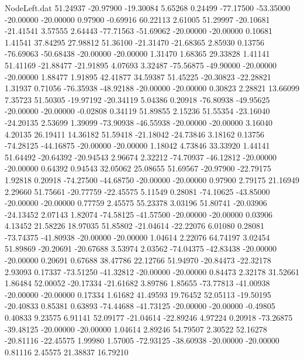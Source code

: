 \begin{filecontents}{NodeLeft.dat}
  51.24937  -20.97900  -19.30084     5.65268    0.24499  -77.17500  -53.35000  -20.00000  -20.00000    0.97900   -0.69916   60.22113    2.61005
  51.29997  -20.10681  -21.41541     3.57555    2.64443  -77.71563  -51.69062  -20.00000  -20.00000    0.10681    1.41541   37.84295   27.98812
  51.36100  -21.31470  -21.68365     2.85930    0.13756  -76.69063  -50.68438  -20.00000  -20.00000    1.31470    1.68365   29.33828    1.41141
  51.41169  -21.88477  -21.91895     4.07693    3.32487  -75.56875  -49.90000  -20.00000  -20.00000    1.88477    1.91895   42.41877   34.59387
  51.45225  -20.30823  -22.28821     1.31937    0.71056  -76.35938  -48.92188  -20.00000  -20.00000    0.30823    2.28821   13.66099    7.35723
  51.50305  -19.97192  -20.34119     5.04386    0.20918  -76.80938  -49.95625  -20.00000  -20.00000   -0.02808    0.34119   51.89855    2.15236
  51.55354  -23.16040  -24.20135     2.53699    1.39099  -73.90938  -46.55938  -20.00000  -20.00000    3.16040    4.20135   26.19411   14.36182
  51.59418  -21.18042  -24.73846     3.18162    0.13756  -74.28125  -44.16875  -20.00000  -20.00000    1.18042    4.73846   33.33920    1.44141
  51.64492  -20.64392  -20.94543     2.96674    2.32212  -74.70937  -46.12812  -20.00000  -20.00000    0.64392    0.94543   32.05062   25.08655
  51.69567  -20.97900  -22.79175     1.92818    0.20918  -74.27500  -44.68750  -20.00000  -20.00000    0.97900    2.79175   21.16949    2.29660
  51.75661  -20.77759  -22.45575     5.11549    0.28081  -74.10625  -43.85000  -20.00000  -20.00000    0.77759    2.45575   55.23378    3.03196
  51.80741  -20.03906  -24.13452     2.07143    1.82074  -74.58125  -41.57500  -20.00000  -20.00000    0.03906    4.13452   21.58226   18.97035
  51.85802  -21.04614  -22.22076     6.01080    0.28081  -73.74375  -41.80938  -20.00000  -20.00000    1.04614    2.22076   64.74197    3.02454
  51.89869  -20.20691  -20.67688     3.53974    2.03562  -74.04375  -42.83438  -20.00000  -20.00000    0.20691    0.67688   38.47786   22.12766
  51.94970  -20.84473  -22.32178     2.93093    0.17337  -73.51250  -41.32812  -20.00000  -20.00000    0.84473    2.32178   31.52661    1.86484
  52.00052  -20.17334  -21.61682     3.89786    1.85655  -73.77813  -41.00938  -20.00000  -20.00000    0.17334    1.61682   41.49593   19.76452
  52.05113  -19.50195  -20.40833     0.85381    0.63893  -74.44688  -41.73125  -20.00000  -20.00000   -0.49805    0.40833    9.23575    6.91141
  52.09177  -21.04614  -22.89246     4.97224    0.20918  -73.26875  -39.48125  -20.00000  -20.00000    1.04614    2.89246   54.79507    2.30522
  52.16278  -20.81116  -22.45575     1.99980    1.57005  -72.93125  -38.60938  -20.00000  -20.00000    0.81116    2.45575   21.38837   16.79210

\end{filecontents}
